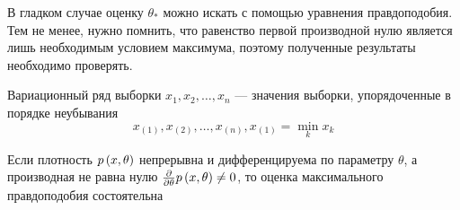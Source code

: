 \begin{remark}
    В гладком случае оценку $\theta_*$ можно искать
    с помощью уравнения правдоподобия.
    Тем не менее, нужно помнить, что равенство первой производной нулю
    является лишь необходимым условием максимума,
    поэтому полученные результаты необходимо проверять.
\end{remark}

\begin{definition}
    Вариационный ряд выборки $x_1, x_2, \dots, x_n$ --- значения выборки,
    упорядоченные в порядке неубывания
    $$x_{\left(1\right)}, x_{\left(2\right)}, \dots, x_{\left(n\right)},
    x_{\left(1\right)}=\underset{k}\min{x_k}$$
\end{definition}

\begin{theorem}
    Если плотность $p\left(x,\theta\right)$
    непрерывна и дифференцируема по параметру $\theta$,
    а производная не равна нулю
    $\frac{\partial}{\partial\theta}p\left(x,\theta\right)\neq 0$,
    то оценка максимального правдоподобия состоятельна
\end{theorem}
